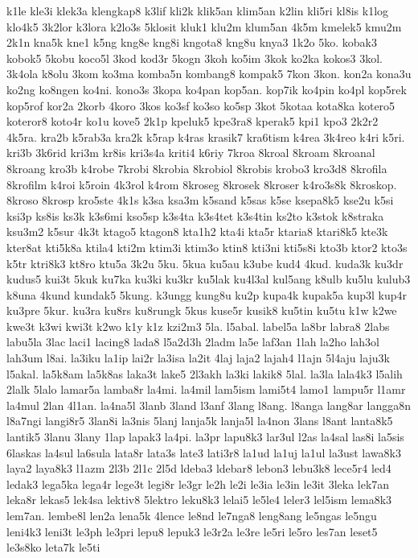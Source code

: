 {k1le kle3i klek3a klengkap8 k3lif kli2k klik5an klim5an k2lin kli5ri kl8is
k1log klo4k5 3k2lor k3lora k2lo3s 5klosit kluk1 klu2m klum5an 4k5m kmelek5
kmu2m 2k1n kna5k kne1 k5ng kng8e kng8i kngota8 kng8u knya3 1k2o 5ko.
kobak3 kobok5 5kobu koco5l 3kod kod3r 5kogn 3koh ko5im 3kok ko2ka kokos3
3kol. 3k4ola k8olu 3kom ko3ma komba5n kombang8 kompak5 7kon 3kon. kon2a
kona3u ko2ng ko8ngen ko4ni. kono3s 3kopa ko4pan kop5an. kop7ik ko4pin
ko4pl kop5rek kop5rof kor2a 2korb 4koro 3kos ko3sf ko3so ko5sp 3kot 5kotaa
kota8ka kotero5 koteror8 koto4r ko1u kove5 2k1p kpeluk5 kpe3ra8 kperak5
kpi1 kpo3 2k2r2 4k5ra. kra2b k5rab3a kra2k k5rap k4ras krasik7 kra6tism
k4rea 3k4reo k4ri k5ri. kri3b 3k6rid kri3m kr8is kri3s4a kriti4 k6riy
7kroa 8kroal 8kroam 8kroanal 8kroang kro3b k4robe 7krobi 8krobia 8krobiol
8krobis krobo3 kro3d8 8krofila 8krofilm k4roi k5roin 4k3rol k4rom 8kroseg
8krosek 8kroser k4ro3s8k 8kroskop. 8kroso 8krosp kro5ste 4k1s k3sa ksa3m
k5sand k5sas k5se ksepa8k5 kse2u k5si ksi3p ks8is ks3k k3s6mi kso5sp
k3s4ta k3s4tet k3s4tin ks2to k3stok k8straka ksu3m2 k5sur 4k3t ktago5
ktagon8 kta1h2 kta4i kta5r ktaria8 ktari8k5 kte3k kter8at kti5k8a ktila4
kti2m ktim3i ktim3o ktin8 kti3ni kti5s8i kto3b ktor2 kto3s k5tr ktri8k3
kt8ro ktu5a 3k2u 5ku. 5kua ku5au k3ube kud4 4kud. kuda3k ku3dr kudus5
kui3t 5kuk ku7ka ku3ki ku3kr ku5lak ku4l3al kul5ang k8ulb ku5lu kulub3
k8una 4kund kundak5 5kung. k3ungg kung8u ku2p kupa4k kupak5a kup3l kup4r
ku3pre 5kur. ku3ra ku8rs ku8rungk 5kus kuse5r kusik8 ku5tin ku5tu k1w k2we
kwe3t k3wi kwi3t k2wo k1y k1z kzi2m3 5la. l5abal. label5a la8br labra8
2labs labu5la 3lac laci1 lacing8 lada8 l5a2d3h 2ladm la5e laf3an 1lah
la2ho lah3ol lah3um l8ai. la3iku la1ip lai2r la3isa la2it 4laj laja2
lajah4 l1ajn 5l4aju laju3k l5akal. la5k8am la5k8as laka3t lake5 2l3akh
la3ki lakik8 5lal. la3la lala4k3 l5alih 2lalk 5lalo lamar5a lamba8r la4mi.
la4mil lam5ism lami5t4 lamo1 lampu5r l1amr la4mul 2lan 4l1an. la4na5l
3lanb 3land l3anf 3lang l8ang. l8anga lang8ar langga8n l8a7ngi langi8r5
3lan8i la3nis 5lanj lanja5k lanja5l la4non 3lans l8ant lanta8k5 lantik5
3lanu 3lany 1lap lapak3 la4pi. la3pr lapu8k3 lar3ul l2as la4sal las8i
la5sis 6laskas la4sul la6sula lata8r lata3s late3 lati3r8 la1ud la1uj
la1ul la3ust lawa8k3 laya2 laya8k3 l1azm 2l3b 2l1c 2l5d ldeba3 ldebar8
lebon3 lebu3k8 lece5r4 led4 ledak3 lega5ka lega4r lege3t legi8r le3gr le2h
le2i le3ia le3in le3it 3leka lek7an leka8r lekas5 lek4sa lektiv8 5lektro
leku8k3 lelai5 le5le4 leler3 lel5ism lema8k3 lem7an. lembe8l len2a lena5k
4lence le8nd le7nga8 leng8ang le5ngas le5ngu leni4k3 leni3t le3ph le3pri
lepu8 lepuk3 le3r2a le3re le5ri le5ro les7an leset5 le3s8ko leta7k le5ti
}
